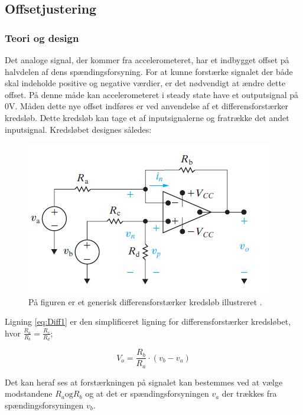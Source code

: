 \subsection{Offsetjustering}
\subsubsection{Teori og design}
Det analoge signal, der kommer fra accelerometeret, har et indbygget offset på halvdelen af dens spændingsforsyning. For at kunne forstærke signalet der både skal indeholde positive og negative værdier, er det nødvendigt at ændre dette offset. På denne måde kan  accelerometeret i steady state have et outputsignal på $0$V. Måden dette nye offset indføres er ved anvendelse af et differensforstærker kredsløb. Dette kredsløb kan tage et af inputsignalerne og  fratrække det  andet inputsignal. Kredsløbet designes således:

\begin{figure}[H]
\centering
\includegraphics[scale=1]{figures/cProblemloesning/Differensforstaerker_generisk.png}
\caption{På figuren er et generisk differensforstærker kredsløb illustreret \cite{Nilsson2011}.}
\label{fig:Differensforstaerker_generisk}
\end{figure}

Ligning \ref{eq:Diff1} er den simplificeret ligning for differensforstærker kredsløbet, hvor $\frac{R_a}{R_b} = \frac{R_c}{R_d}$;

\begin{equation}\label{eq:Diff1}
V_o = \frac{R_b}{R_a} \cdot (v_b - v_a)
\end{equation}

Det kan heraf ses at forstærkningen på signalet kan bestemmes ved at vælge modstandene $R_a \text{og} R_b$ og at det er spændingsforsyningen $v_a$ der trækkes fra spændingsforsyningen $v_b$. 

